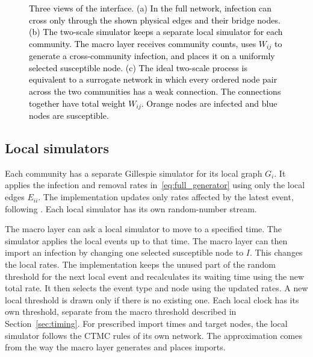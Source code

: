 \documentclass[a4paper,fleqn]{cas-sc}
\begin{document}
\begin{figure}[tbp]
\caption{\textcolor{black}{Three views of the interface. (a) In the full network, infection can cross only through the shown physical edges and their bridge nodes. (b) The two-scale simulator keeps a separate local simulator for each community. The macro layer receives community counts, uses $W_{ij}$ to generate a cross-community infection, and places it on a uniformly selected susceptible node. (c) The ideal two-scale process is equivalent to a surrogate network in which every ordered node pair across the two communities has a weak connection. The connections together have total weight $W_{ij}$. Orange nodes are infected and blue nodes are susceptible.}}
\label{fig:schematic}
\end{figure}

\subsection{Local simulators}
\label{sec:local}

Each community has a separate Gillespie simulator for its local graph $G_i$. It applies the infection and removal rates in~\eqref{eq:full_generator} using only the local edges $E_{ii}$. The implementation updates only rates affected by the latest event, following \citet{kuryliak2025simulating}. Each local simulator has its own random-number stream.

The macro layer can ask a local simulator to move to a specified time. The simulator applies the local events up to that time. The macro layer can then import an infection by changing one selected susceptible node to $I$. This changes the local rates. The implementation keeps the unused part of the random threshold for the next local event and recalculates its waiting time using the new total rate. It then selects the event type and node using the updated rates. A new local threshold is drawn only if there is no existing one. Each local clock has its own threshold, separate from the macro threshold described in Section~\ref{sec:timing}. For prescribed import times and target nodes, the local simulator follows the CTMC rules of its own network. The approximation comes from the way the macro layer generates and places imports.
\end{document}
